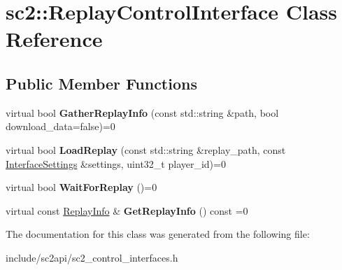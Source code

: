 \hypertarget{classsc2_1_1_replay_control_interface}{}\section{sc2\+:\+:Replay\+Control\+Interface Class Reference}
\label{classsc2_1_1_replay_control_interface}
\subsection*{Public Member Functions}
\begin{DoxyCompactItemize}
\item 
\mbox{\label{classsc2_1_1_replay_control_interface_ab02a7083b6ff67d68fb28e9d1e4f9c05}} 
virtual bool {\bfseries Gather\+Replay\+Info} (const std\+::string \&path, bool download\+\_\+data=false)=0
\item 
\mbox{\label{classsc2_1_1_replay_control_interface_ad3d5fe4c38b7e1fe1c09b2557374e904}} 
virtual bool {\bfseries Load\+Replay} (const std\+::string \&replay\+\_\+path, const \hyperlink{structsc2_1_1_interface_settings}{Interface\+Settings} \&settings, uint32\+\_\+t player\+\_\+id)=0
\item 
\mbox{\label{classsc2_1_1_replay_control_interface_af7bc6661abca0916236f3d00363b072e}} 
virtual bool {\bfseries Wait\+For\+Replay} ()=0
\item 
\mbox{\label{classsc2_1_1_replay_control_interface_ae14304ff62e00d1f7f99f6d2876c9444}} 
virtual const \hyperlink{structsc2_1_1_replay_info}{Replay\+Info} \& {\bfseries Get\+Replay\+Info} () const =0
\end{DoxyCompactItemize}


The documentation for this class was generated from the following file\+:\begin{DoxyCompactItemize}
\item 
include/sc2api/sc2\+\_\+control\+\_\+interfaces.\+h\end{DoxyCompactItemize}
